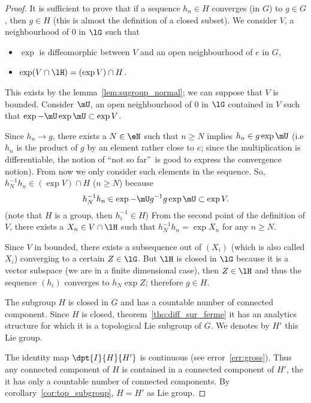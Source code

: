\begin{proof}
 It is sufficient to prove that if a sequence $h_n\in H$ converges (in $G$) to $g\in G$, then $g\in H$ (this is almost the definition of a closed subset). We consider $V$, a neighbourhood of $0$ in $\lG$ such that

\begin{itemize}
\item $\exp$ is diffeomorphic between $V$ and an open neighbourhood  of $e$ in $G$,
\item $\exp(V\cap \lH)=(\exp V)\cap H$.
\end{itemize}
This exists by the lemma~\ref{lem:sugroup_normal}; we can suppose that $V$ is bounded. Consider $\mU$, an open neighbourhood of $0$ in $\lG$ contained in $V$ such that $\exp-\mU\exp\mU\subset\exp V$.

Since $h_n\to g$, there exists a $N\in\eN$ such that $n\geq N$ implies $h_n\in g\exp\mU$ (i.e $h_n$ is the product of $g$ by an element rather close to $e$; since the multiplication is differentiable, the notion of ``not so far''\ is good to express the convergence notion). From now we only consider such elements in the sequence. So, $h_N^{-1} h_n\in(\exp V)\cap H$ ($n\geq N$) because
\[
   h_N^{-1} h_n\in\exp-\mU g^{-1} g\exp\mU\subset\exp V.
\]
(note that $H$ is a group, then $h_i^{-1}\in H$) From the second point of the definition of $V$, there exists a $X_n\in V\cap\lH$ such that $h^{-1}_N h_n=\exp X_n$ for any $n\geq N$.

Since $V$ in bounded, there exists a subsequence out of $(X_i)$ (which is also called $X_i$) converging to a certain $Z\in\lG$. But $\lH$ is closed in $\lG$ because it is a vector subspace (we are in a finite dimensional case), then $Z\in\lH$ and thus the sequence $(h_i)$ converges to $h_N\exp Z$; therefore $g\in H$.

 The subgroup $H$ is closed in $G$ and has a countable number of connected component. Since $H$ is closed, theorem~\ref{tho:diff_sur_ferme} it has an analytics structure for which it is a topological Lie subgroup of $G$. We denotes by $H'$ this Lie group.

The identity map $\dpt{I}{H}{H'}$ is continuous (see error~\ref{err:gross}). Thus any connected component of $H$ is contained in a connected component of $H'$, the it has only a countable number of connected components. By corollary~\ref{cor:top_subgroup}, $H=H'$ as Lie group.
\end{proof}

